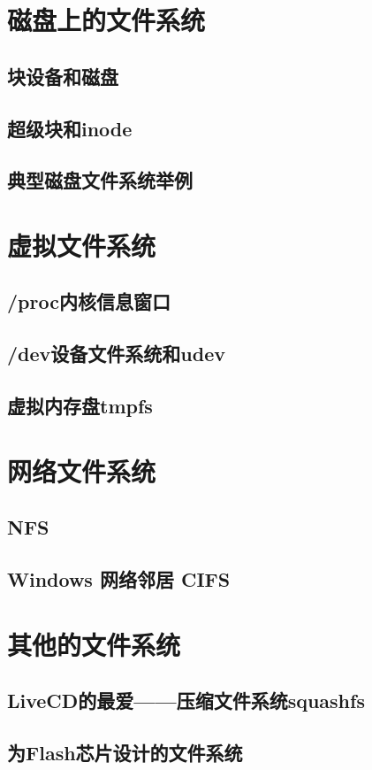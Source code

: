 \documentclass[amstex,twoside]{ctexbook}
\begin{document}
\section{  磁盘上的文件系统	}
\subsection{  块设备和磁盘}
\subsection{ 超级块和inode}
\subsection{  典型磁盘文件系统举例}
\section{  虚拟文件系统	}
\subsection{  /proc内核信息窗口}
\subsection{  /dev设备文件系统和udev}
\subsection{  虚拟内存盘tmpfs}
\section{  网络文件系统	}
\subsection{  NFS	}
\subsection{  Windows 网络邻居 CIFS	}
\section{  其他的文件系统	}
\subsection{  LiveCD的最爱——压缩文件系统squashfs}
\subsection{  为Flash芯片设计的文件系统}
\end{document}
